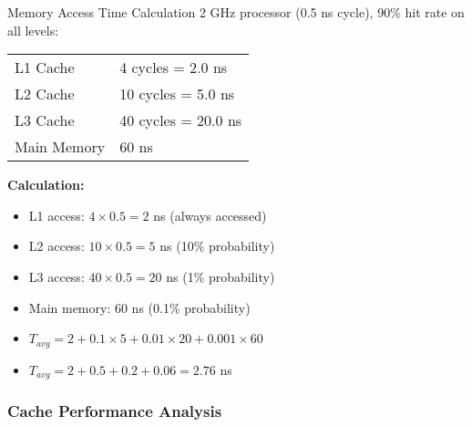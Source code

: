 \begin{example2}{Memory Access Time Calculation}
    2 GHz processor (0.5 ns cycle), 90\% hit rate on all levels:
    
    \begin{tabular}{|l|l|}
        \hline
        L1 Cache & 4 cycles = 2.0 ns \\
        L2 Cache & 10 cycles = 5.0 ns \\
        L3 Cache & 40 cycles = 20.0 ns \\
        Main Memory & 60 ns \\
        \hline
    \end{tabular}
    
    \tcblower
    
    \textbf{Calculation:}
    \begin{itemize}
        \item L1 access: $4 \times 0.5 = 2$ ns (always accessed)
        \item L2 access: $10 \times 0.5 = 5$ ns (10\% probability)
        \item L3 access: $40 \times 0.5 = 20$ ns (1\% probability)  
        \item Main memory: 60 ns (0.1\% probability)
        \item $T_{avg} = 2 + 0.1 \times 5 + 0.01 \times 20 + 0.001 \times 60$
        \item $T_{avg} = 2 + 0.5 + 0.2 + 0.06 = 2.76$ ns
    \end{itemize}
\end{example2}

\subsubsection{Cache Performance Analysis}


